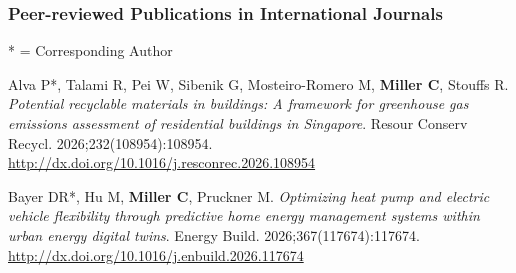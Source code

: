 \documentclass[10pt,a4paper]{article}
\begin{document}
\begin{small}
\subsubsection*{Peer-reviewed Publications in International Journals}
* = Corresponding Author


\begin{etaremune}

\item 
Alva P*, Talami R, Pei W, Sibenik G, Mosteiro-Romero M, \textbf{Miller C}, Stouffs R. \emph{Potential recyclable materials in buildings: A framework for greenhouse gas emissions assessment of residential buildings in Singapore}. Resour Conserv Recycl. 2026;232(108954):108954. \url{http://dx.doi.org/10.1016/j.resconrec.2026.108954}

\item 
Bayer DR*, Hu M, \textbf{Miller C}, Pruckner M. \emph{Optimizing heat pump and electric vehicle flexibility through predictive home energy management systems within urban energy digital twins}. Energy Build. 2026;367(117674):117674. \url{http://dx.doi.org/10.1016/j.enbuild.2026.117674}
  

\end{etaremune}
\end{small}
\end{document}

